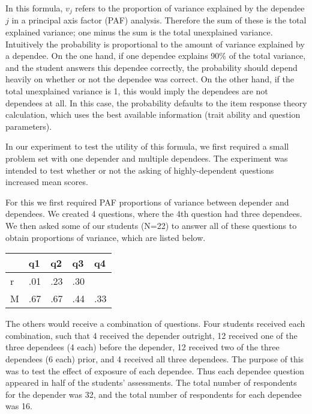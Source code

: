 \documentclass[a4paper,twocolumn]{article}
\begin{document}
In this formula, $v_j$ refers to the proportion of variance explained by the
dependee $j$ in a principal axis factor (PAF) analysis.  Therefore the sum of
these is the total explained variance; one minus the sum is the total
unexplained variance.  Intuitively the probability is proportional to the
amount of variance explained by a dependee.  On the one hand, if one dependee
explains 90\% of the total variance, and the student answers this dependee
correctly, the probability should depend heavily on whether or not the dependee
was correct.  On the other hand, if the total unexplained variance is 1, this
would imply the dependees are not dependees at all.  In this case, the
probability defaults to the item response theory calculation, which uses the
best available information (trait ability and question parameters).

In our experiment to test the utility of this formula, we first required a
small problem set with one depender and multiple dependees.  The experiment
was intended to test whether or not the asking of highly-dependent questions
increased mean scores.

For this we first required PAF proportions of variance between depender and
dependees.  We created 4 questions, where the 4th question had three dependees.
We then asked some of our students (N=22) to answer all of these questions to
obtain proportions of variance, which are listed below.  

\begin{center}
\begin{tabular}{|l|l|l|l|l|}
                                \hline
    &   q1 &  q2  & q3 & q4  \\ \hline
 r  &  .01 & .23 & .30 &     \\ \hline
 M  &  .67 & .67 & .44 & .33 \\ \hline
\end{tabular}
\end{center}

The others would receive a combination of questions. Four students received each
combination, such that 4 received the depender outright, 12 received one of the
three dependees (4 each) before the depender, 12 received two of the three
dependees (6 each) prior, and 4 received all three dependees.  The purpose of
this was to test the effect of exposure of each dependee.  Thus each dependee
question appeared in half of the students' assessments.  The total number of
respondents for the depender was 32, and the total number of respondents for
each dependee was 16. 
\end{document}
